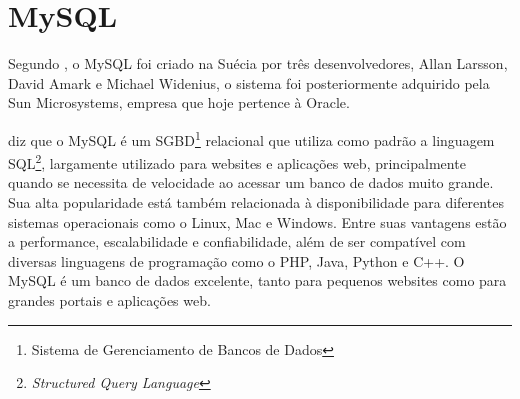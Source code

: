 \section{MySQL}
	\par Segundo , o MySQL foi criado na Suécia por três desenvolvedores, Allan Larsson, David Amark e Michael Widenius, o sistema foi posteriormente adquirido pela Sun Microsystems, empresa que hoje pertence à Oracle.
	\par {} diz que o MySQL é um SGBD\footnote{Sistema de Gerenciamento de Bancos de Dados} relacional que utiliza como padrão a linguagem SQL\footnote{\textit{Structured Query Language}}, largamente utilizado para websites e aplicações web, principalmente quando se necessita de velocidade ao acessar um banco de dados muito grande. Sua alta popularidade está também relacionada à disponibilidade para diferentes sistemas operacionais como o Linux, Mac e Windows. Entre suas vantagens estão a performance, escalabilidade e confiabilidade, além de ser compatível com diversas linguagens de programação como o PHP, Java, Python e C++. O MySQL é um banco de dados excelente, tanto para pequenos websites como para grandes portais e aplicações web.

